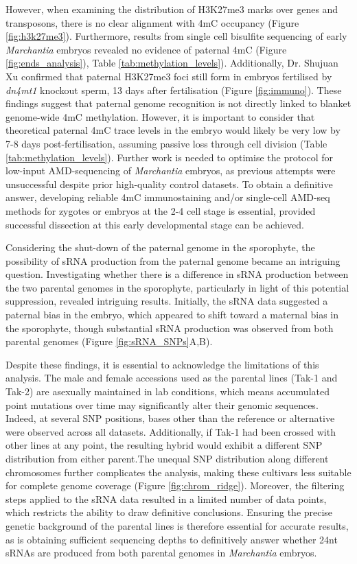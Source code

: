 However, when examining the distribution of H3K27me3 marks over genes and transposons, there is no clear alignment with 4mC occupancy (Figure \ref{fig:h3k27me3}). Furthermore, results from single cell bisulfite sequencing of early \textit{Marchantia} embryos revealed no evidence of paternal 4mC (Figure \ref{fig:ends_analysis}), Table \ref{tab:methylation_levels}). Additionally, Dr. Shujuan Xu confirmed that paternal H3K27me3 foci still form in embryos fertilised by \textit{dn4mt1} knockout sperm, 13 days after fertilisation (Figure \ref{fig:immuno}). These findings suggest that paternal genome recognition is not directly linked to blanket genome-wide 4mC methylation. However, it is important to consider that theoretical paternal 4mC trace levels in the embryo would likely be very low by 7-8 days post-fertilisation, assuming passive loss through cell division (Table \ref{tab:methylation_levels}). Further work is needed to optimise the protocol for low-input AMD-sequencing of \textit{Marchantia} embryos, as previous attempts were unsuccessful despite prior high-quality control datasets. To obtain a definitive answer,  developing reliable 4mC immunostaining and/or single-cell AMD-seq methods for zygotes or embryos at the 2-4 cell stage is essential, provided successful dissection at this early developmental stage can be achieved.

 Considering the shut-down of the paternal genome in the sporophyte, the possibility of sRNA production from the paternal genome became an intriguing question. Investigating whether there is a difference in sRNA production between the two parental genomes in the sporophyte, particularly in light of this potential suppression, revealed intriguing results. Initially, the sRNA data suggested a paternal bias in the embryo, which appeared to shift toward a maternal bias in the sporophyte, though substantial sRNA production was observed from both parental genomes (Figure \ref{fig:sRNA_SNPs}A,B). 
 
 Despite these findings, it is essential to acknowledge the limitations of this analysis. The male and female accessions used as the parental lines (Tak-1 and Tak-2) are asexually maintained in lab conditions, which means accumulated point mutations over time may significantly alter their genomic sequences. Indeed, at several SNP positions, bases other than the reference or alternative were observed across all datasets. Additionally, if Tak-1 had been crossed with other lines at any point, the resulting hybrid would exhibit a different SNP distribution from either parent.The unequal SNP distribution along different chromosomes further complicates the analysis, making these cultivars less suitable for complete genome coverage (Figure \ref{fig:chrom_ridge}). Moreover, the filtering steps applied to the sRNA data resulted in a limited number of data points, which restricts the ability to draw definitive conclusions. Ensuring the precise genetic background of the parental lines is therefore essential for accurate results, as is obtaining sufficient sequencing depths to definitively answer whether 24nt sRNAs are produced from both parental genomes in \textit{Marchantia} embryos. 
 
